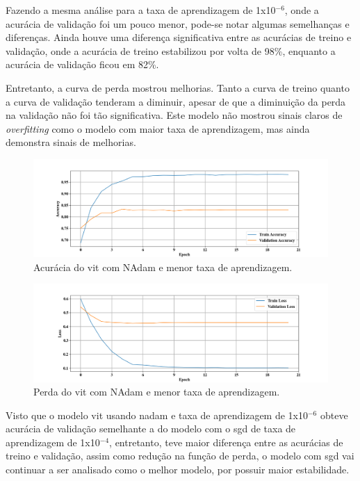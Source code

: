 Fazendo a mesma análise para a taxa de aprendizagem de 1x10$^{-6}$, onde a acurácia de validação foi um pouco menor, pode-se notar algumas semelhanças e diferenças.
Ainda houve uma diferença significativa entre as acurácias de treino e validação, onde a acurácia de treino estabilizou por volta de 98\%, enquanto a acurácia de validação ficou em 82\%.

Entretanto, a curva de perda mostrou melhorias. Tanto a curva de treino quanto a curva de validação tenderam a diminuir, apesar de que a diminuição da perda na validação não foi tão significativa.
Este modelo não mostrou sinais claros de \textit{overfitting} como o modelo com maior taxa de aprendizagem, mas ainda demonstra sinais de melhorias.

\begin{figure}[tb]
     \centerline{\includegraphics[width=1\linewidth]{images/resultados/nadam_accuracy_1e06.png}}
     \caption{Acurácia do \acrshort{vit} com NAdam e menor taxa de aprendizagem.}
     \label{fig:nadam_acc_1x1006}
\end{figure}
     
\begin{figure}[tb]
     \centerline{\includegraphics[width=1\linewidth]{images/resultados/nadam_loss_1e06.png}}
     \caption{Perda do \acrshort{vit} com NAdam e menor taxa de aprendizagem.}
     \label{fig:nadam_loss_1x1006}
\end{figure}

Visto que o modelo \acrshort{vit} usando \acrshort{nadam} e taxa de aprendizagem de 1x10$^{-6}$ obteve acurácia de validação semelhante a do modelo com o \acrshort{sgd} de taxa de aprendizagem de 1x10$^{-4}$,
entretanto, teve maior diferença entre as acurácias de treino e validação, assim como redução na função de perda, o modelo com \acrshort{sgd} vai continuar a ser analisado como o melhor modelo, por possuir maior estabilidade.

